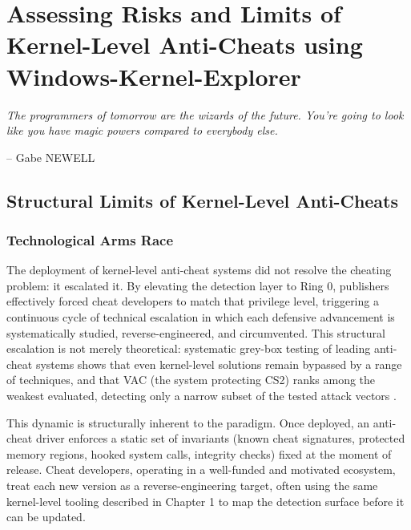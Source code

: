 \chapter{Assessing Risks and Limits of Kernel-Level Anti-Cheats
using Windows-Kernel-Explorer}
\label{chap:two}

\epigraph{\itshape The programmers of tomorrow are the wizards of the future. You're going to look like you have magic powers compared to everybody else.}{-- Gabe NEWELL}

\stopcontents[chapters]

\startcontents[chapters]

\printMyMinitoc

\fancyhead[LE]{\textsc{\chaptername~\thechapter}}

\section{Structural Limits of Kernel-Level Anti-Cheats}
\label{sec:two:one}

\subsection{Technological Arms Race}
\label{sec:two:one:one}

The deployment of kernel-level anti-cheat systems did not resolve the cheating problem: it escalated it. By elevating the detection layer to Ring 0, publishers effectively forced cheat developers to match that privilege level, triggering a continuous cycle of technical escalation in which each defensive advancement is systematically studied, reverse-engineered, and circumvented. This structural escalation is not merely theoretical: systematic grey-box testing of leading anti-cheat systems shows that even kernel-level solutions remain bypassed by a range of techniques, and that VAC (the system protecting CS2) ranks among the weakest evaluated, detecting only a narrow subset of the tested attack vectors \cite{Collins2024}.

This dynamic is structurally inherent to the paradigm. Once deployed, an anti-cheat driver enforces a static set of invariants (known cheat signatures, protected memory regions, hooked system calls, integrity checks) fixed at the moment of release. Cheat developers, operating in a well-funded and motivated ecosystem, treat each new version as a reverse-engineering target, often using the same kernel-level tooling described in Chapter 1 to map the detection surface before it can be updated.

